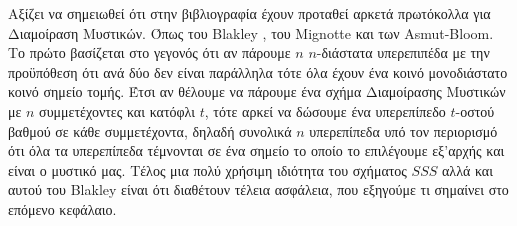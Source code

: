Αξίζει να σημειωθεί ότι στην βιβλιογραφία έχουν προταθεί αρκετά πρωτόκολλα για Διαμοίραση Μυστικών. Όπως του Blakley \cite{blakley1979safeguarding}, του Mignotte και των Asmut-Bloom. Το πρώτο βασίζεται στο γεγονός ότι αν πάρουμε $n$ $n$-διάστατα υπερεπιπέδα με την προϋπόθεση ότι ανά δύο δεν είναι παράλληλα τότε όλα έχουν ένα κοινό μονοδιάστατο κοινό σημείο τομής. Έτσι αν θέλουμε να πάρουμε ένα σχήμα Διαμοίρασης Μυστικών με $n$ συμμετέχοντες και κατόφλι $t$, τότε αρκεί να δώσουμε ένα υπερεπίπεδο $t$-οστού βαθμού σε κάθε συμμετέχοντα, δηλαδή συνολικά $n$ υπερεπίπεδα υπό τον περιορισμό ότι όλα τα υπερεπίπεδα τέμνονται σε ένα σημείο το οποίο το επιλέγουμε εξ'αρχής και είναι ο μυστικό μας. Τέλος μια πολύ χρήσιμη ιδιότητα του σχήματος $SSS$ αλλά και αυτού του Blakley είναι ότι διαθέτουν τέλεια ασφάλεια, που εξηγούμε τι σημαίνει στο επόμενο κεφάλαιο. 
